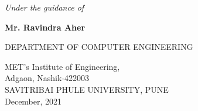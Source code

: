 \documentclass[openany,12pt]{report}
\begin{document}
\begin{titlepage}
\begin{center}
			\vspace{0.4in}
			
			{\it Under the guidance of}\\
			
			\vspace{0.1in}
			
			{\bf Mr. Ravindra Aher}\\
			\vspace{0.4in}
			
			
			{\small DEPARTMENT OF COMPUTER ENGINEERING}\\
			\begin{figure}[h]
				\centerline{}
				\label{atcres}
			\end{figure}
			{\large MET's Institute of Engineering,}\\
			{\small Adgaon, Nashik-422003}\\
			SAVITRIBAI PHULE UNIVERSITY, PUNE\\
			\vspace{0.2in}
			{\small December, 2021}
		\end{center}
	\end{titlepage}
	
\end{document}
